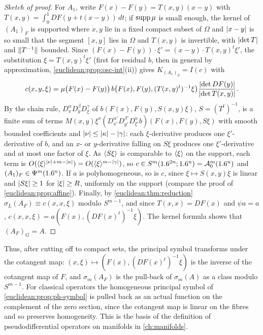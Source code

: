 \begin{proof}[Sketch of proof]
  For $A_1$, write $F(x)-F(y)=T(x,y)(x-y)$ with
  $T(x,y)=\int_0^1DF(y+t(x-y))\,dt$; if $\operatorname{supp}\mu$ is small enough, the
  kernel of $(A_1)_F$ is supported where $x,y$ lie in a fixed compact subset
  of $\Omega$ and $\lvert x-y\rvert$ is so small that the segment $[x,y]$ lies in
  $\Omega$ and $T(x,y)$ is invertible, with $\lvert \det T\rvert$ and $\lVert T^{-1}\rVert$
  bounded. Since $(F(x)-F(y))\cdot\xi'=(x-y)\cdot T(x,y)^t\xi'$, the
  substitution $\xi=T(x,y)^t\xi'$ (first for residual $b$, then in general by
  approximation, \cref{euclidean:prop:osc-int}(ii)) gives
  $K_{(A_1)_F}=I(c)$ with
  \begin{equation*}
    c(x,y,\xi)=\mu\bigl(F(x)-F(y)\bigr)\,b\bigl(F(x),F(y),(T(x,y)^t)^{-1}\xi\bigr)
    \frac{\lvert \det DF(y)\rvert}{\lvert \det T(x,y)\rvert}.
  \end{equation*}
  By the chain rule, $D^\alpha_xD^\beta_yD^\gamma_\xi$ of
  $b(F(x),F(y),S(x,y)\xi)$, $S=(T^t)^{-1}$, is a finite sum of terms
  $M(x,y)\xi^\nu(D^{\alpha'}_{x'}D^{\beta'}_{y'}D^{\kappa}_{\xi'}b)(F(x),F(y),S\xi)$
  with smooth bounded coefficients and $\lvert \nu\rvert\le\lvert \kappa\rvert-\lvert \gamma\rvert$:
  each $\xi$-derivative produces one $\xi'$-derivative of $b$, and an $x$- or
  $y$-derivative falling on $S\xi$ produces one $\xi'$-derivative and at most
  one factor of $\xi$. As $\langle S\xi\rangle$ is comparable to $\langle \xi\rangle$ on the
  support, each term is $O(\langle \xi\rangle^{\lvert \nu\rvert+m-\lvert \kappa\rvert})=O(\langle \xi\rangle^{m-\lvert \gamma\rvert})$,
  so $c\in S^m(1.6^{2n};1.6^n)=\mathcal{A}^{m}_{0}(1.6^n)$ and $(A_1)_F\in\Psi^{m}(1.6^n)$. If
  $a$ is polyhomogeneous, so is $c$, since $\xi\mapsto S(x,y)\xi$ is linear
  and $\lvert S\xi\rvert\ge1$ for $\lvert \xi\rvert\ge R$, uniformly on the support (compare
  the proof of \cref{euclidean:prop:affine}). Finally, by
  \cref{euclidean:thm:reduction} $\sigma_L(A_F)\equiv c(x,x,\xi)$ modulo
  $S^{m-1}$, and since $T(x,x)=DF(x)$ and $\psi a=a$,
  $c(x,x,\xi)=a(F(x),(DF(x)^t)^{-1}\xi)$. The kernel formula shows that
  $(A_F)_G=A$.
\end{proof}

Thus, after cutting off to compact sets, the principal symbol transforms
under the cotangent map: $(x,\xi)\mapsto(F(x),(DF(x)^t)^{-1}\xi)$ is the inverse
of the cotangent map of $F$, and $\sigma_m(A_F)$ is the pull-back of $\sigma_m(A)$
as a class modulo $S^{m-1}$. For classical operators the homogeneous principal
symbol of \cref{euclidean:prop:ph-symbol} is pulled back as an actual function
on the complement of the zero section, since the cotangent map is linear on the
fibres and so preserves homogeneity. This is the basis of the
definition of pseudodifferential operators on manifolds in
\cref{ch:manifolds}.

